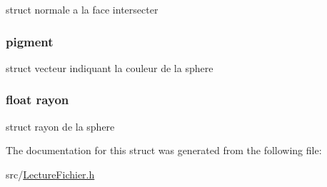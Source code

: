 \label{structsphere_a944738f40a0294270a0047acc5a77ee2}
struct normale a la face intersecter \hypertarget{structsphere_a5a4ee24431a1811fa1c8b75844198987}{
\subsubsection[{pigment}]{ {\bf pigment}}}
\label{structsphere_a5a4ee24431a1811fa1c8b75844198987}
struct vecteur indiquant la couleur de la sphere \hypertarget{structsphere_aa23f7a160698c954b6073da64f9bd3f0}{
\subsubsection[{rayon}]{\setlength{\rightskip}{0pt plus 5cm}float {\bf rayon}}}
\label{structsphere_aa23f7a160698c954b6073da64f9bd3f0}
struct rayon de la sphere 

The documentation for this struct was generated from the following file:\begin{DoxyCompactItemize}
\item 
src/\hyperlink{_lecture_fichier_8h}{LectureFichier.h}\end{DoxyCompactItemize}
